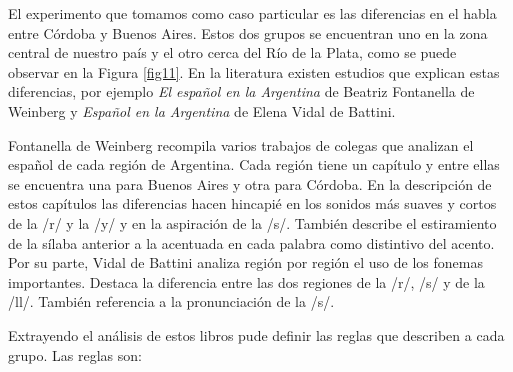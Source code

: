 El experimento que tomamos como caso particular es las diferencias en el habla entre Córdoba y Buenos Aires. Estos dos grupos se encuentran uno en la zona central de nuestro país y el otro cerca del Río de la Plata, como se puede observar en la Figura \ref{fig11}. En la literatura existen estudios que explican estas diferencias, por ejemplo \textit{El español en la Argentina} de Beatriz Fontanella de Weinberg  y \textit{Español en la Argentina} de Elena Vidal de Battini. 

Fontanella de Weinberg recompila varios trabajos de colegas que analizan el español de cada región de Argentina. Cada región tiene un capítulo y entre ellas se encuentra una para Buenos Aires y otra para Córdoba. En la descripción de estos capítulos las diferencias hacen hincapié en los sonidos más suaves y cortos de la /r/ y la /y/ y en la aspiración de la /s/. También describe el estiramiento de la sílaba anterior a la acentuada en cada palabra como distintivo del acento. Por su parte, Vidal de Battini analiza región por región el uso de los fonemas importantes. Destaca la diferencia entre las dos regiones de la /r/, /s/ y de la /ll/. También referencia a la pronunciación de la /s/.

Extrayendo el análisis de estos libros pude definir las reglas que describen a cada grupo. Las reglas son: 

